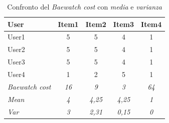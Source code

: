 \documentclass[letterpaper]{article}
\begin{document}
\begin{table}[h]
\centering
\begin{tabular}{|l|c|c|c|c|}
\hline
\textbf{User}          & \multicolumn{1}{l|}{\textbf{Item1}} & \multicolumn{1}{l|}{\textbf{Item2}} & \multicolumn{1}{l|}{\textbf{Item3}} & \multicolumn{1}{l|}{\textbf{Item4}} \\ \hline
User1                  & 5                                   & 5                                   & 4                                   & 1                                   \\ \hline
User2                  & 5                                   & 5                                   & 4                                   & 1                                   \\ \hline
User3                  & 5                                   & 5                                   & 4                                   & 1                                   \\ \hline
User4                  & 1                                   & 2                                   & 5                                   & 1                                   \\ \hline
\textit{Baewatch cost} & \textit{16}                         & \textit{9}                          & \textit{3}                          & \textit{64}                         \\ \hline
\textit{Mean}          & \textit{4}                          & \textit{4,25}                       & \textit{4,25}                       & \textit{1}                          \\ \hline
\textit{Var}           & \textit{3}                          & \textit{2,31}                       & \textit{0,15}                       & \textit{0}                          \\ \hline
\end{tabular}
\caption{Confronto del \textit{Baewatch cost} con \textit{media} e \textit{varianza}}
\label{table:3}
\end{table}
\end{document}
